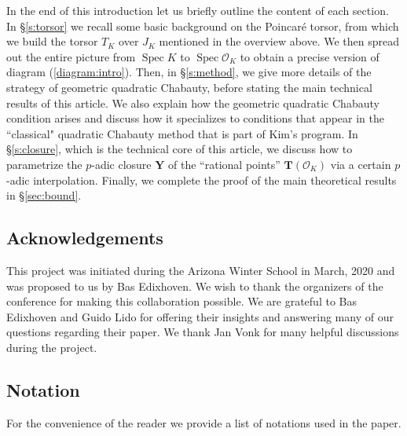 \documentclass[11pt,oneside]{amsart}
\theoremstyle{plain}
\theoremstyle{definition}
\DeclareMathOperator{\spec}{Spec} \DeclareMathOperator{\sgn}{sign}
\def\TT{\mathbf{T}}
\def\Y{\mathbf{Y}}
\def\oh{\mathcal{O}}
\begin{document}
In the end of this introduction let us briefly outline the content of each section. In \S \ref{s:torsor} we recall some basic background on the Poincar\'e torsor, from which we build the torsor $T_K$ over $J_K$ mentioned in the overview above. We then spread out the entire picture from $\spec K$ to $\spec \oh_K$ to obtain a precise version of diagram (\ref{diagram:intro}). Then, in \S \ref{s:method}, we give more details of the strategy of geometric quadratic Chabauty, before stating the main technical results of this article. We also explain how the geometric quadratic Chabauty condition arises and discuss how it specializes to conditions that appear in the ``classical" quadratic Chabauty method that is part of Kim's program. In \S \ref{s:closure}, which is the technical core of this article, we discuss how to parametrize the $p$-adic closure $\Y$ of the ``rational points'' $\TT(\oh_K)$ via a certain $p$-adic interpolation. Finally, we complete the proof of the main theoretical results in \S \ref{sec:bound}.  



\subsection*{Acknowledgements}

This project was initiated during the Arizona Winter School in March, 2020 and was proposed to us by Bas Edixhoven. We wish to thank the organizers of the conference for making this collaboration possible. We are grateful to Bas Edixhoven and Guido Lido for offering their insights and answering many of our questions regarding their paper. We thank Jan Vonk for many helpful discussions during the project.   



\subsection*{Notation} \label{ss:notation}

For the convenience of the reader we provide a list of notations used in the paper.
\end{document}
